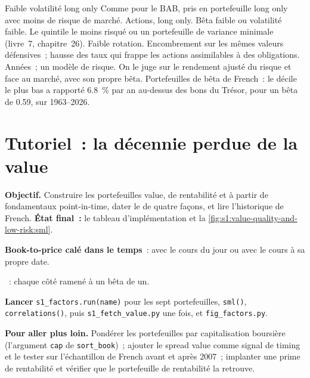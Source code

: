 \begin{strategyfile}{Faible volatilité long only}\label{strat:s1:value-quality-and-low-risk:lowvol}
 Comme pour le BAB, pris en portefeuille long only avec moins de risque de marché.
 Actions, long only.
 Bêta faible ou volatilité faible.
 Le quintile le moins risqué ou un portefeuille de variance minimale (livre~7, chapitre~26).
 Faible rotation.
 Encombrement sur les mêmes valeurs défensives~; hausse des taux qui frappe les actions assimilables à des obligations.
 Années~; un modèle de risque.
 On le juge sur le rendement ajusté du risque et face au marché, avec son propre bêta.
 Portefeuilles de bêta de French~: le décile le plus bas a rapporté 6.8~\% par an au-dessus des bons du Trésor, pour un bêta de 0.59, sur 1963--2026.
\end{strategyfile}

\section{Tutoriel~: la décennie perdue de la value}\label{tut:s1:value-quality-and-low-risk:tut}

\begin{tutorial}
\textbf{Objectif.} Construire les portefeuilles value, de rentabilité et  à partir de fondamentaux point-in-time, dater le  de quatre façons, et lire l'historique
de French. \textbf{État final~:} le tableau d'implémentation et la \cref{fig:s1:value-quality-and-low-risk:sml}.
\begin{tutsteps}
\item \textbf{Book-to-price calé dans le temps}~: avec le cours du jour ou avec le cours à sa propre date.
\label{lst:s1:value-quality-and-low-risk:bp}
\item \textbf{}~: chaque côté ramené à un bêta de un.
\label{lst:s1:value-quality-and-low-risk:bab}
\item \textbf{Lancer} \texttt{s1\_factors.run(name)} pour les sept portefeuilles, \texttt{sml()}, \texttt{correlations()}, puis \texttt{s1\_fetch\_value.py} une fois, et
\texttt{fig\_factors.py}.
\end{tutsteps}
\textbf{Pour aller plus loin.} Pondérer les portefeuilles par capitalisation boursière (l'argument \texttt{cap} de \texttt{sort\_book})~; ajouter le spread value comme signal de timing et le tester sur l'échantillon de French
avant et après 2007~; implanter une prime de rentabilité et vérifier que le portefeuille de rentabilité la retrouve.
\end{tutorial}

